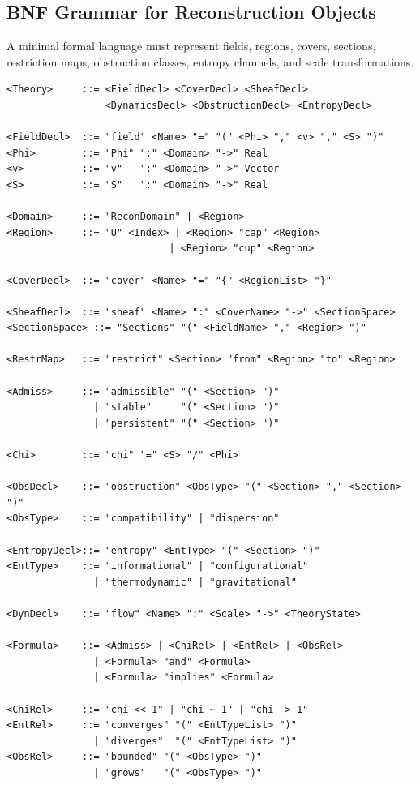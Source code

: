 \documentclass[11pt, a4paper]{article}
\theoremstyle{plain}
\theoremstyle{definition}
\theoremstyle{remark}
\begin{document}
\subsection{BNF Grammar for Reconstruction Objects}

A minimal formal language must represent fields, regions, covers, sections,
restriction maps, obstruction classes, entropy channels, and scale transformations.

\begin{lstlisting}[caption={BNF grammar for RSVP reconstruction theory}]
<Theory>     ::= <FieldDecl> <CoverDecl> <SheafDecl>
                 <DynamicsDecl> <ObstructionDecl> <EntropyDecl>

<FieldDecl>  ::= "field" <Name> "=" "(" <Phi> "," <v> "," <S> ")"
<Phi>        ::= "Phi" ":" <Domain> "->" Real
<v>          ::= "v"   ":" <Domain> "->" Vector
<S>          ::= "S"   ":" <Domain> "->" Real

<Domain>     ::= "ReconDomain" | <Region>
<Region>     ::= "U" <Index> | <Region> "cap" <Region>
                            | <Region> "cup" <Region>

<CoverDecl>  ::= "cover" <Name> "=" "{" <RegionList> "}"

<SheafDecl>  ::= "sheaf" <Name> ":" <CoverName> "->" <SectionSpace>
<SectionSpace> ::= "Sections" "(" <FieldName> "," <Region> ")"

<RestrMap>   ::= "restrict" <Section> "from" <Region> "to" <Region>

<Admiss>     ::= "admissible" "(" <Section> ")"
               | "stable"     "(" <Section> ")"
               | "persistent" "(" <Section> ")"

<Chi>        ::= "chi" "=" <S> "/" <Phi>

<ObsDecl>    ::= "obstruction" <ObsType> "(" <Section> "," <Section> ")"
<ObsType>    ::= "compatibility" | "dispersion"

<EntropyDecl>::= "entropy" <EntType> "(" <Section> ")"
<EntType>    ::= "informational" | "configurational"
               | "thermodynamic" | "gravitational"

<DynDecl>    ::= "flow" <Name> ":" <Scale> "->" <TheoryState>

<Formula>    ::= <Admiss> | <ChiRel> | <EntRel> | <ObsRel>
               | <Formula> "and" <Formula>
               | <Formula> "implies" <Formula>

<ChiRel>     ::= "chi << 1" | "chi ~ 1" | "chi -> 1"
<EntRel>     ::= "converges" "(" <EntTypeList> ")"
               | "diverges"  "(" <EntTypeList> ")"
<ObsRel>     ::= "bounded" "(" <ObsType> ")"
               | "grows"   "(" <ObsType> ")"
\end{lstlisting}
\end{document}
